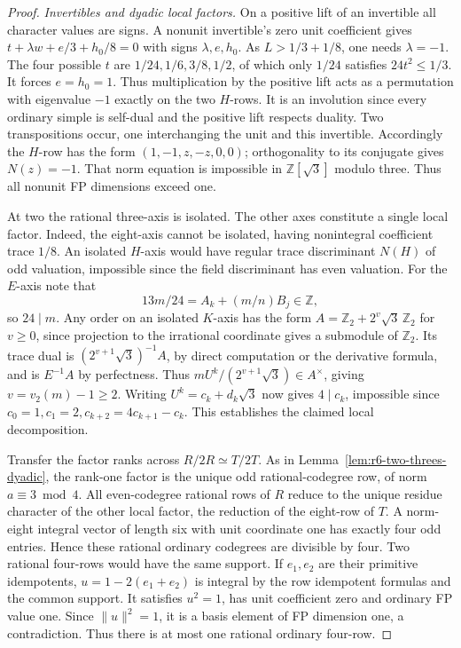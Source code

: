 \documentclass[11pt,reqno]{amsart}
\theoremstyle{remark}\newtheorem{remark}[theorem]{Remark}
\numberwithin{equation}{section}
\begin{document}
\begin{proof}
\emph{Invertibles and dyadic local factors.}
On a positive lift of an invertible all character values are signs. A nonunit invertible's zero unit coefficient gives
$t+\lambda w+e/3+h_0/8=0$ with signs $\lambda,e,h_0$. As $L>1/3+1/8$, one needs $\lambda=-1$. The four possible $t$ are $1/24,1/6,3/8,1/2$, of which only $1/24$ satisfies $24t^2\le1/3$. It forces $e=h_0=1$. Thus multiplication by the positive lift acts as a permutation with eigenvalue $-1$ exactly on the two $H$-rows. It is an involution since every ordinary simple is self-dual and the positive lift respects duality. Two transpositions occur, one interchanging the unit and this invertible. Accordingly the $H$-row has the form $(1,-1,z,-z,0,0)$; orthogonality to its conjugate gives $N(z)=-1$. That norm equation is impossible in $\mathbb Z[\sqrt3]$ modulo three. Thus all nonunit FP dimensions exceed one.

At two the rational three-axis is isolated. The other axes constitute a single local factor. Indeed, the eight-axis cannot be isolated, having nonintegral coefficient trace $1/8$. An isolated $H$-axis would have regular trace discriminant $N(H)$ of odd valuation, impossible since the field discriminant has even valuation. For the $E$-axis note that
\[
  13m/24=A_k+(m/n)B_j\in\mathbb Z ,
\]
so $24\mid m$. Any order on an isolated $K$-axis has the form $A=\mathbb Z_2+2^v\sqrt3\,\mathbb Z_2$ for $v\ge0$, since projection to the irrational coordinate gives a submodule of $\mathbb Z_2$. Its trace dual is $(2^{v+1}\sqrt3)^{-1}A$, by direct computation or the derivative formula, and is $E^{-1}A$ by perfectness. Thus $mU^k/(2^{v+1}\sqrt3)\in A^\times$, giving $v=v_2(m)-1\ge2$. Writing $U^k=c_k+d_k\sqrt3$ now gives $4\mid c_k$, impossible since $c_0=1,c_1=2,c_{k+2}=4c_{k+1}-c_k$. This establishes the claimed local decomposition.

Transfer the factor ranks across $R/2R\simeq T/2T$.
As in Lemma~\ref{lem:r6-two-threes-dyadic}, the rank-one factor is
the unique odd rational-codegree row, of norm $a\equiv3\bmod4$. All even-codegree rational rows of $R$ reduce to the unique residue character of the other local factor, the reduction of the eight-row of $T$. A norm-eight integral vector of length six with unit coordinate one has exactly four odd entries. Hence these rational ordinary codegrees are divisible by four. Two rational four-rows would have the same support. If $e_1,e_2$ are their primitive idempotents, $u=1-2(e_1+e_2)$ is integral by the row idempotent formulas and the common support. It satisfies $u^2=1$, has unit coefficient zero and ordinary FP value one. Since $\|u\|^2=1$, it is a basis element of FP dimension one, a contradiction. Thus there is at most one rational ordinary four-row.


\end{proof}
\end{document}
